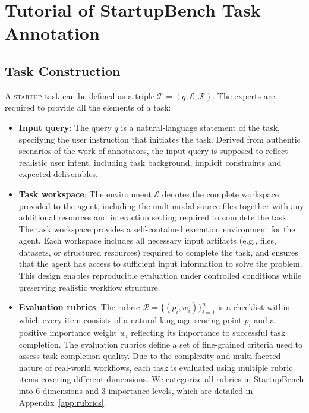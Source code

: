 
\section{Tutorial of StartupBench Task Annotation}

\subsection{Task Construction}
\label{app:task_construction}

A \textsc{startup} task can be defined as a triple $\mathcal{T}=(q,\mathcal{E},\mathcal{R})$.
The experts are required to provide all the elements of a task:

\begin{itemize}
    \item \textbf{Input query}: The query $q$ is a natural-language statement of the task, specifying the user instruction that initiates the task. Derived from authentic scenarios of the work of annotators, the input query is supposed to reflect realistic user intent, including task background, implicit constraints and expected deliverables.

    \item \textbf{Task workspace}: The environment $\mathcal{E}$ denotes the complete workspace provided to the agent, including the multimodal source files together with any additional resources and interaction setting required to complete the task. The task workspace provides a self-contained execution environment for the agent. Each workspace includes all necessary input artifacts (e.g., files, datasets, or structured resources) required to complete the task, and ensures that the agent has access to sufficient input information to solve the problem. This design enables reproducible evaluation under controlled conditions while preserving realistic workflow structure.

    \item \textbf{Evaluation rubrics}: The rubric $\mathcal{R}=\{(p_i,w_i)\}_{i=1}^{n}$ is a checklist within which every item consists of a natural-language scoring point $p_i$ and a positive importance weight $w_i$ reflecting its importance to successful task completion. The evaluation rubrics define a set of fine-grained criteria used to assess task completion quality. Due to the complexity and multi-faceted nature of real-world workflows, each task is evaluated using multiple rubric items covering different dimensions. We categorize all rubrics in StartupBench into 6 dimensions and 3 importance levels, which are detailed in Appendix~\ref{app:rubrics}.

\end{itemize}

